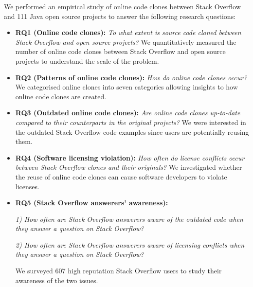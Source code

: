 \documentclass[10pt,journal,compsoc]{IEEEtran}
\begin{document}
We performed an empirical study of online code clones between Stack
Overflow and 111 Java open source projects to answer the following
research questions:
\begin{itemize}
	\item \textbf{RQ1 (Online code clones): }\textit{To what extent is source
		code cloned between Stack Overflow and open source projects?} We
	quantitatively measured the number of online code clones between Stack
	Overflow and open source projects to understand the scale of the
	problem. 
	\item \textbf{RQ2 (Patterns of online code clones): }\textit{How do online
		code clones occur?} We categorised online clones into seven
	categories allowing insights to how online code clones are created.
	\item \textbf{RQ3 (Outdated online code clones): }\textit{Are
		online code clones up-to-date compared to their counterparts in the
		original projects?} We were interested in the outdated Stack
	Overflow code examples since users are potentially reusing
	them. 
	\item \textbf{RQ4 (Software licensing violation): }\textit{How often do
		license conflicts occur between Stack Overflow clones and their
		originals?} We investigated whether the reuse of online code clones
	can cause software developers to violate licenses.
	\item \textbf{RQ5 (Stack Overflow answerers' awareness): }
	
	\textit{1) How often are Stack Overflow
		answerers aware of the outdated code when
		they answer a question on Stack Overflow?} 
	
	\textit{2) How often are Stack Overflow
			answerers aware of licensing conflicts when
			they answer a question on Stack Overflow?} 
	
	We surveyed 607 high reputation Stack Overflow users to study their
	awareness of the two issues.
\end{itemize}
\end{document}
